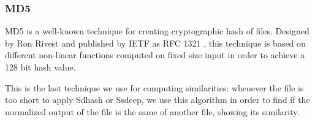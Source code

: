 \subsubsection{MD5}
MD5 is a well-known technique for creating cryptographic hash of files. Designed by Ron Rivest and published by IETF as RFC 1321 \cite{md5}, this technique is based on different non-linear functions computed on fixed size input in order to achieve a 128 bit hash value.

This is the last technique we use for computing similarities: whenever the file is too short to apply Sdhash or Ssdeep, we use this algorithm in order to find if the normalized output of the file is the same of another file, showing its similarity.
